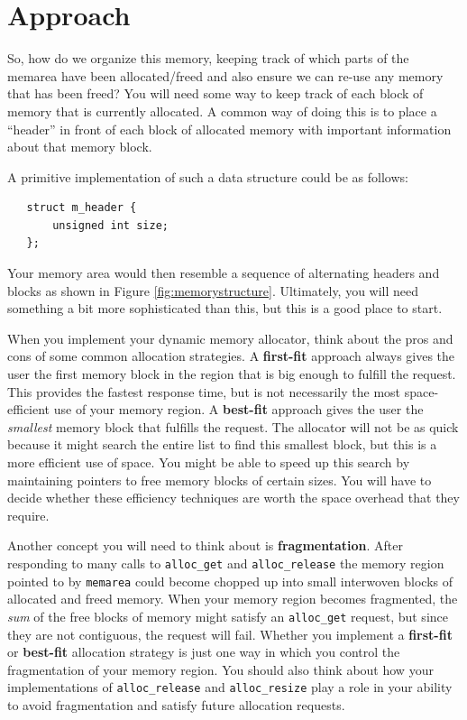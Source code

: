 \documentclass[12pt]{article}
\begin{document}
\section{Approach}

So, how do we organize this memory, keeping track of which parts of the memarea have been allocated/freed and also ensure we can re-use any memory that has been freed? You will need some way to keep track of each block of memory that is currently allocated. A common way of doing this is to place a ``header'' in front of each block of allocated memory with important information about that memory block. 

A primitive implementation of such a data structure could be as follows:

\begin{verbatim}
   struct m_header {
       unsigned int size;
   };
\end{verbatim}

Your memory area would then resemble a sequence of alternating headers and blocks as shown in Figure \ref{fig:memorystructure}. Ultimately, you will need something a bit more sophisticated than this, but this is a good place to start.

When you implement your dynamic memory allocator, think about the pros and cons of some common allocation strategies. A \textbf{first-fit} approach always gives the user the first memory block in the region that is big enough to fulfill the request. This provides the fastest response time, but is not necessarily the most space-efficient use of your memory region. A \textbf{best-fit} approach gives the user the \emph{smallest} memory block that fulfills the request. The allocator will not be as quick because it might search the entire list to find this smallest block, but this is a more efficient use of space. You might be able to speed up this search by maintaining pointers to free memory blocks of certain sizes. You will have to decide whether these efficiency techniques are worth the space overhead that they require. 

Another concept you will need to think about is \textbf{fragmentation}. After responding to many calls to \texttt{alloc\_get} and \texttt{alloc\_release} the memory region pointed to by \texttt{memarea} could become chopped up into small interwoven blocks of allocated and freed memory. When your memory region becomes fragmented, the \emph{sum} of the free blocks of memory might satisfy an \texttt{alloc\_get} request, but since they are not contiguous, the request will fail. Whether you implement a \textbf{first-fit} or  \textbf{best-fit} allocation strategy is just one way in which you control the fragmentation of your memory region. You should also think about how your implementations of \texttt{alloc\_release} and  \texttt{alloc\_resize} play a role in your ability to avoid fragmentation and satisfy future allocation requests. 
\end{document}

